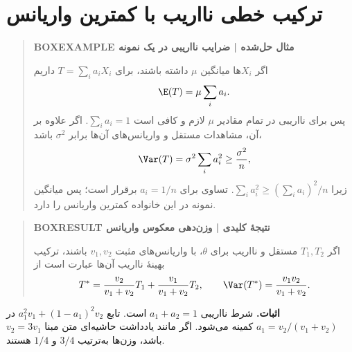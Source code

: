 \section{ترکیب خطی نااریب با کمترین واریانس}
\begin{quote}\textbf{BOXEXAMPLE مثال حل‌شده | ضرایب نااریبی در یک نمونه}\par 
اگر $X_i$ها میانگین $\mu$ داشته باشند، برای $T=\sum_i a_iX_i$ داریم
\[\E(T)=\mu\sum_i a_i.\]
پس برای نااریبی در تمام مقادیر $\mu$ لازم و کافی است $\sum_i a_i=1$. اگر علاوه بر آن، مشاهدات مستقل و واریانس‌های آن‌ها برابر $\sigma^2$ باشد،
\[\Var(T)=\sigma^2\sum_i a_i^2\ge\frac{\sigma^2}{n},\]
زیرا $\sum_i a_i^2\ge(\sum_i a_i)^2/n$. تساوی برای $a_i=1/n$ برقرار است؛ پس میانگین نمونه در این خانواده کمترین واریانس را دارد.
\end{quote}
\begin{quote}\textbf{BOXRESULT نتیجهٔ کلیدی | وزن‌دهی معکوس واریانس}\par 
اگر $T_1,T_2$ مستقل و نااریب برای $\theta$، با واریانس‌های مثبت $v_1,v_2$ باشند، ترکیب بهینهٔ نااریب آن‌ها عبارت است از
\[
T^*=\frac{v_2}{v_1+v_2}T_1+\frac{v_1}{v_1+v_2}T_2,
\qquad \Var(T^*)=\frac{v_1v_2}{v_1+v_2}.
\]
\end{quote}
\textbf{اثبات.} شرط نااریبی $a_1+a_2=1$ است. تابع $a_1^2v_1+(1-a_1)^2v_2$ در $a_1=v_2/(v_1+v_2)$ کمینه می‌شود. اگر مانند یادداشت حاشیه‌ای متن مبنا $v_2=3v_1$ باشد، وزن‌ها به‌ترتیب $3/4$ و $1/4$ هستند.
